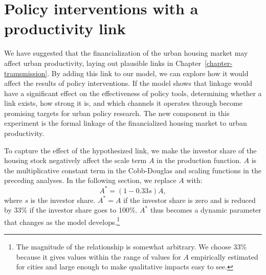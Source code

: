\section{Policy interventions with a productivity link}


We have suggested that the financialization of the urban housing market may affect urban productivity, laying out plausible links in Chapter~\ref{chapter-tramsmission}. %
By adding this link to our model, we can explore how it would affect the results of policy interventions. If the model shows that linkage would have a significant effect on the effectiveness of policy tools, determining whether a link exists, how strong it is, %
and which channels it operates through become promising targets for urban policy research. 
The new component in this experiment  %
is the formal linkage of the financialized housing market to urban productivity.

To capture the effect of the hypothesized link, we %
make the investor share of the housing stock negatively affect the scale term $A$ in the production function. $A$ is the multiplicative constant term in the Cobb-Douglas and scaling functions in the preceding analyses. In the following section, we replace $A$ with:   
\[A^*= (1-0.33s)A,\]
where $s$ is the investor share. $A^*= A$ if the investor share is zero and is reduced by 33\% if the investor share goes to 100\%. $A^*$ thus becomes a dynamic parameter that changes as the model develops.\footnote{The magnitude of the relationship is somewhat arbitrary. %
We choose 33\% because it gives values within the range of values for $A$ empirically estimated for cities and large enough to make qualitative impacts easy to see. %
} 



